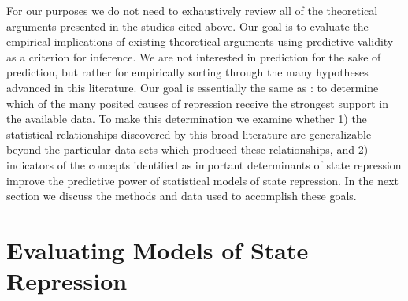 \documentclass[11pt]{article}
\begin{document}
For our purposes we do not need to exhaustively review all of the theoretical arguments presented in the studies cited above. Our goal is to evaluate the empirical implications of existing theoretical arguments using predictive validity as a criterion for inference. We are not interested in prediction for the sake of prediction, but rather for empirically sorting through the many hypotheses advanced in this literature. Our goal is essentially the same as \citet{PoeTate1994}: to determine which of the many posited causes of repression receive the strongest support in the available data. To make this determination we examine whether 1) the statistical relationships discovered by this broad literature are generalizable beyond the particular data-sets which produced these relationships, and 2) indicators of the concepts identified as important determinants of state repression improve the predictive power of statistical models of state repression. In the next section we discuss the methods and data used to accomplish these goals.

\section{Evaluating Models of State Repression}
 
\end{document}
